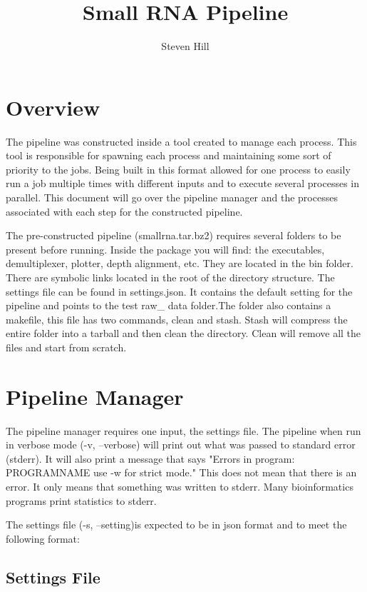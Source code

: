 \documentclass[10pt,a4paper]{article}
\author{Steven Hill}
\title{Small RNA Pipeline}
\begin{document}
\maketitle

\section{Overview}

The pipeline was constructed inside a tool created to manage each process. This tool is responsible for spawning each process and maintaining some sort of priority to the jobs. Being built in this format allowed for one process to easily run a job multiple times with different inputs and to execute several processes in parallel. This document will go over the pipeline manager and the processes associated with each step for the constructed pipeline.

The pre-constructed pipeline (smallrna.tar.bz2) requires several folders to be present before running. Inside the package you will find: the executables, demultiplexer, plotter, depth alignment, etc. They are located in the bin folder. There are symbolic links located in the root of the directory structure. The settings file can be found in settings.json. It contains the default setting for the pipeline and points to the test\/ raw\_ data folder.The folder also contains a makefile, this file has two commands, clean and stash. Stash will compress the entire folder into a tarball and then clean the directory. Clean will remove all the files and start from scratch.

\section{Pipeline Manager}
 
 The pipeline manager requires one input, the settings file. The pipeline when run in verbose mode (-v, --verbose) will print out what was passed to standard error (stderr). It will also print a message that says "Errors in program: PROGRAMNAME use -w for strict mode." This does not mean that there is an error. It only means that something was written to stderr. Many bioinformatics programs print statistics to stderr.
 
The settings file (-s, --setting)is expected to be in json format and to meet the following format:
\subsection{Settings File}
\end{document}

